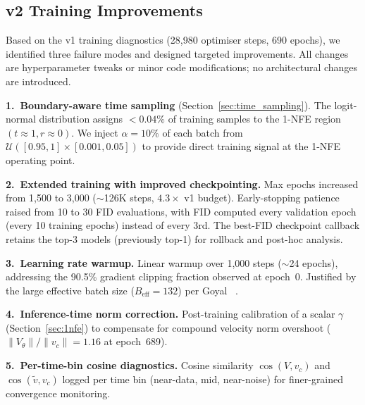 \subsection{v2 Training Improvements}
\label{sec:v2}

Based on the v1 training diagnostics (28{,}980 optimiser steps, 690 epochs),
we identified three failure modes and designed targeted improvements.  All
changes are hyperparameter tweaks or minor code modifications; no architectural
changes are introduced.

\textbf{1.\ Boundary-aware time sampling} (Section~\ref{sec:time_sampling}).
The logit-normal distribution assigns $< 0.04\%$ of training samples to the
1-NFE region $(t \approx 1, r \approx 0)$.  We inject $\alpha = 10\%$ of each
batch from $\mathcal{U}([0.95, 1] \times [0.001, 0.05])$ to provide direct
training signal at the 1-NFE operating point.

\textbf{2.\ Extended training with improved checkpointing.}
Max epochs increased from 1{,}500 to 3{,}000 (${\sim}$126K steps,
$4.3\times$ v1 budget).  Early-stopping patience raised from 10 to 30 FID
evaluations, with FID computed every validation epoch (every 10 training epochs)
instead of every 3rd.  The best-FID checkpoint callback retains the top-3
models (previously top-1) for rollback and post-hoc analysis.

\textbf{3.\ Learning rate warmup.}
Linear warmup over 1{,}000 steps (${\sim}$24 epochs), addressing the 90.5\%
gradient clipping fraction observed at epoch~0.  Justified by the large
effective batch size ($B_\text{eff} = 132$) per Goyal \etal~\cite{goyal2017accurate}.

\textbf{4.\ Inference-time norm correction.}
Post-training calibration of a scalar $\gamma$ (Section~\ref{sec:1nfe})
to compensate for compound velocity norm overshoot ($\|V_\theta\|/\|v_c\|
= 1.16$ at epoch~689).

\textbf{5.\ Per-time-bin cosine diagnostics.}
Cosine similarity $\cos(V, v_c)$ and $\cos(\tilde{v}, v_c)$ logged per
time bin (near-data, mid, near-noise) for finer-grained convergence monitoring.
